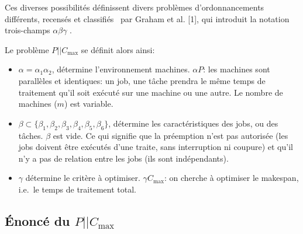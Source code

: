 \documentclass[a4paper,12pt]{report}
\theoremstyle{plain}				%
\theoremstyle{definition}				%
\newcommand\problemGrahamP{$P||C_{\max}$\xspace}
\newcommand{\tdi}[1]{\todo[inline]{{#1}}{}}
\newcommand{\lp}[1]{\todo[author=LP,color=yellow,inline]{#1}}
\begin{document}

Ces diverses possibilités définissent divers problèmes
d'ordonnancements différents, recensés et classifiés
\ par Graham et al. [1], qui introduit la notation trois-champs $\alpha
${\textbar}$\beta ${\textbar}$\gamma $ .

\bigskip

Le problème \problemGrahamP se définit alors ainsi:

\begin{itemize}

\item $\alpha = \alpha_1 \alpha_2$, détermine l'environnement
  machines.
  $\alpha P$: les machines sont parallèles et identiques: un job,
  une tâche prendra le même temps de traitement qu'il soit exécuté sur
  une machine ou une autre.
  Le nombre de machines ($m$) est variable.

\item $\beta \subset \{ \beta_1, \beta_2, \beta_3,
  \beta_4, \beta_5, \beta_6\}$, détermine les caractéristiques
  des jobs, ou des tâches.
  $\beta$ est vide.
  Ce qui signifie que la préemption n'est pas autorisée (les jobs
  doivent être exécutés d'une traite, sans interruption ni coupure)
  et qu'il n'y a pas de relation entre les jobs (ils sont
  indépendants).

\item $\gamma $ détermine le critère à optimiser.
$\gamma C_{\max}$: on cherche à optimiser le makespan,
i.e.\ le temps de traitement total.

\end{itemize}

\bigskip

\subsection{Énoncé du \problemGrahamP}
\end{document}
